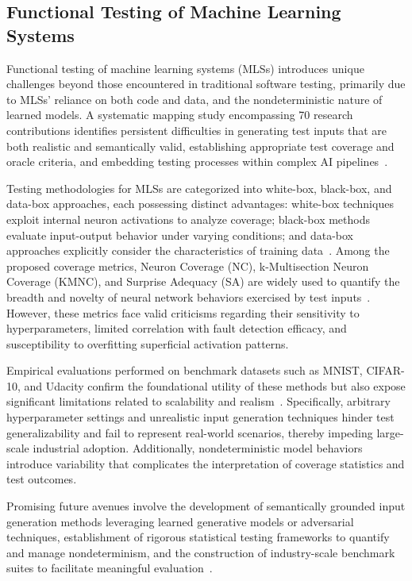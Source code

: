 \documentclass[sigconf]{acmart}
\begin{document}
\subsection{Functional Testing of Machine Learning Systems}

Functional testing of machine learning systems (MLSs) introduces unique challenges beyond those encountered in traditional software testing, primarily due to MLSs’ reliance on both code and data, and the nondeterministic nature of learned models. A systematic mapping study encompassing 70 research contributions identifies persistent difficulties in generating test inputs that are both realistic and semantically valid, establishing appropriate test coverage and oracle criteria, and embedding testing processes within complex AI pipelines~\cite{ref27}.

Testing methodologies for MLSs are categorized into white-box, black-box, and data-box approaches, each possessing distinct advantages: white-box techniques exploit internal neuron activations to analyze coverage; black-box methods evaluate input-output behavior under varying conditions; and data-box approaches explicitly consider the characteristics of training data~\cite{ref27}. Among the proposed coverage metrics, Neuron Coverage (NC), k-Multisection Neuron Coverage (KMNC), and Surprise Adequacy (SA) are widely used to quantify the breadth and novelty of neural network behaviors exercised by test inputs~\cite{ref3}. However, these metrics face valid criticisms regarding their sensitivity to hyperparameters, limited correlation with fault detection efficacy, and susceptibility to overfitting superficial activation patterns.

Empirical evaluations performed on benchmark datasets such as MNIST, CIFAR-10, and Udacity confirm the foundational utility of these methods but also expose significant limitations related to scalability and realism~\cite{ref27}. Specifically, arbitrary hyperparameter settings and unrealistic input generation techniques hinder test generalizability and fail to represent real-world scenarios, thereby impeding large-scale industrial adoption. Additionally, nondeterministic model behaviors introduce variability that complicates the interpretation of coverage statistics and test outcomes.

Promising future avenues involve the development of semantically grounded input generation methods leveraging learned generative models or adversarial techniques, establishment of rigorous statistical testing frameworks to quantify and manage nondeterminism, and the construction of industry-scale benchmark suites to facilitate meaningful evaluation~\cite{ref27}.
\end{document}
